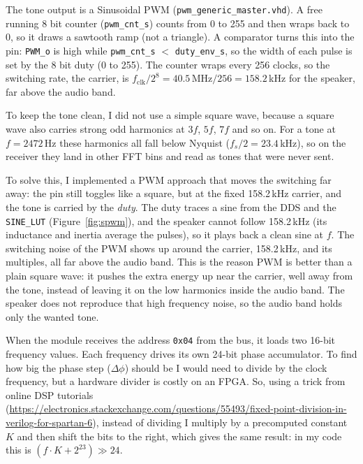 \documentclass[a4paper,10pt]{article}
\begin{document}
The tone output is a Sinusoidal PWM (\texttt{pwm\_generic\_master.vhd}). A free running 8 bit
counter (\texttt{pwm\_cnt\_s}) counts from 0 to 255 and then wraps back to 0, so it draws a
sawtooth ramp (not a triangle). A comparator turns this into the pin: \texttt{PWM\_o} is high
while \texttt{pwm\_cnt\_s} $<$ \texttt{duty\_env\_s}, so the width of each pulse is set by the
8 bit duty (0 to 255). The counter wraps every 256 clocks, so the switching rate, the
carrier, is $f_\mathrm{clk}/2^{8} = 40.5\,\mathrm{MHz}/256 = 158.2$\,kHz for the speaker, far
above the audio band.

To keep the tone clean, I did not use a simple square wave, because a square wave
also carries strong odd harmonics at $3f$, $5f$, $7f$ and so on.
For a tone at $f=2472$\,Hz these harmonics all fall 
below Nyquist ($f_s/2=23.4$\,kHz), so on the receiver they land in other FFT
bins and read as tones that were never sent.

To solve this, I implemented a PWM approach that moves the switching
 far away: the pin still toggles like a square, but at the fixed 158.2\,kHz 
 carrier, and the tone is carried by the \emph{duty}.
  The duty traces a sine from the DDS and the \texttt{SINE\_LUT} 
  (Figure~\ref{fig:spwm}), and the speaker cannot follow 158.2\,kHz
  (its inductance and inertia average the pulses), so it plays back a 
  clean sine at $f$. The switching noise of the PWM shows up around the carrier, 158.2\,kHz,
  and its multiples, all far above the audio band. This is the reason PWM is better than a
  plain square wave: it pushes the extra energy up near the carrier, well away from the tone,
  instead of leaving it on the low harmonics inside the audio band. The speaker does not
  reproduce that high frequency noise, so the audio band holds only the wanted tone.



When the module receives the address \texttt{0x04} from the bus, it loads two 16-bit
 frequency values. Each frequency drives its own 24-bit phase accumulator. To find how big
 the phase step ($\Delta\phi$) should be I would need to divide by the clock frequency, but
 a hardware divider is costly on an FPGA. So, using a trick from online DSP tutorials
 (\url{https://electronics.stackexchange.com/questions/55493/fixed-point-division-in-verilog-for-spartan-6}),
 instead of dividing I multiply by a precomputed constant $K$ and then shift the bits to the
 right, which gives the same result: in my code this is $(f\cdot K + 2^{23})\gg24$.
\end{document}
